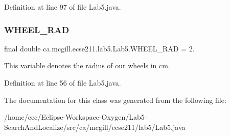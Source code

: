 Definition at line 97 of file Lab5.\+java.

\mbox{\label{classca_1_1mcgill_1_1ecse211_1_1lab5_1_1_lab5_ab9b6fc96d3fb1ac6c7d69d1727b3bbdd}} 
\subsubsection{\texorpdfstring{W\+H\+E\+E\+L\+\_\+\+R\+AD}{WHEEL\_RAD}}
{\footnotesize\ttfamily final double ca.\+mcgill.\+ecse211.\+lab5.\+Lab5.\+W\+H\+E\+E\+L\+\_\+\+R\+AD = 2.\hspace{0.3cm}{\ttfamily [static]}}

This variable denotes the radius of our wheels in cm. 

Definition at line 56 of file Lab5.\+java.



The documentation for this class was generated from the following file\+:\begin{DoxyCompactItemize}
\item 
/home/ccc/\+Eclipse-\/\+Workspace-\/\+Oxygen/\+Lab5-\/\+Search\+And\+Localize/src/ca/mcgill/ecse211/lab5/Lab5.\+java\end{DoxyCompactItemize}
